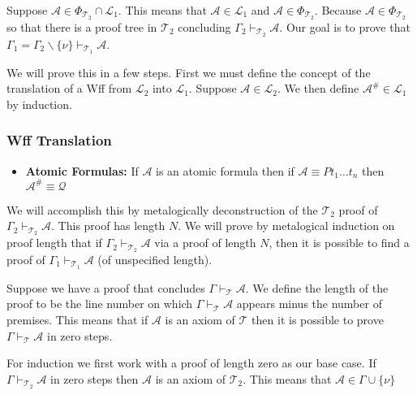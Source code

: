 \documentclass[12pt]{article}
\theoremstyle{break}
\theoremstyle{break}
\theoremstyle{break}
\theoremstyle{break}
\theoremstyle{break}
\newtheorem{informal definition}[definition]{Informal Definition}
\newcommand{\mc}[1]{\mathcal{#1}}
\begin{document}
Suppose $\mc{A} \in \Phi_{\mc{T}_2} \cap \mc{L}_1$.
This means that $\mc{A} \in \mc{L}_1$ and $\mc{A} \in \Phi_{\mc{T}_2}$.
Because $\mc{A} \in \Phi_{\mc{T}_2}$ so that there is a proof tree in $\mc{T}_2$ concluding $\Gamma_2 \vdash_{\mc{T}_2} \mc{A}$.
Our goal is to prove that $\Gamma_1 = \Gamma_2 \backslash \{\nu\} \vdash_{\mc{T}_1} \mc{A}$.

We will prove this in a few steps.
First we must define the concept of the translation of a Wff from $\mc{L}_2$ into $\mc{L}_1$.
Suppose $\mc{A} \in \mc{L}_2$.
We then define $\mc{A}^\# \in \mc{L}_1$ by induction.

\hrulefill
\subsubsection*{Wff Translation}
\begin{itemize}
\item{\textbf{Atomic Formulas:} If $\mc{A}$ is an atomic formula then if $\mc{A} \equiv Pt_1\ldots t_n$ then $\mc{A}^\# \equiv \mc{Q}$}
\end{itemize}
\hrulefill


We will accomplish this by metalogically deconstruction of the $\mc{T}_2$ proof of $\Gamma_2 \vdash_{\mc{T}_2} \mc{A}$.
This proof has length $N$.
We will prove by metalogical induction on proof length that if $\Gamma_2 \vdash_{\mc{T}_2} \mc{A}$ via a proof of length $N$, then it is possible to find a proof of $\Gamma_1 \vdash_{\mc{T}_1} \mc{A}$ (of unspecified length).

Suppose we have a proof that concludes $\Gamma \vdash_{\mc{T}} \mc{A}$.
We define the length of the proof to be the line number on which $\Gamma \vdash_{\mc{T}} \mc{A}$ appears minus the number of premises.
This means that if $\mc{A}$ is an axiom of $\mc{T}$ then it is possible to prove $\Gamma \vdash_{\mc{T}} \mc{A}$ in zero steps.

For induction we first work with a proof of length zero as our base case.
If $\Gamma \vdash_{\mc{T}_2} \mc{A}$ in zero steps then $\mc{A}$ is an axiom of $\mc{T}_2$.
This means that $\mc{A} \in \Gamma \cup \{\nu\}$
\end{document}
